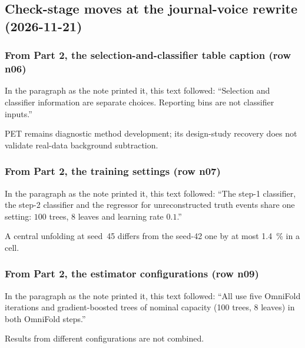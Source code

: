 \subsection{Check-stage moves at the journal-voice rewrite (2026-11-21)}

\subsubsection{From Part 2, the selection-and-classifier table caption (row n06)}
In the paragraph as the note printed it, this text followed: ``Selection and classifier information are separate choices. Reporting bins are not classifier inputs.''\par
PET remains diagnostic method development; its design-study recovery does not validate real-data background subtraction.

\subsubsection{From Part 2, the training settings (row n07)}
In the paragraph as the note printed it, this text followed: ``The step-1 classifier, the step-2 classifier and the regressor for unreconstructed truth events share one setting: $100$ trees, $8$ leaves and learning rate $0.1$.''\par
A central unfolding at seed~45 differs from the seed-42 one by at most \SI{1.4}{\percent} in a cell.

\subsubsection{From Part 2, the estimator configurations (row n09)}
In the paragraph as the note printed it, this text followed: ``All use five OmniFold iterations and gradient-boosted trees of nominal capacity (100 trees, 8 leaves) in both OmniFold steps.''\par
Results from different configurations are not combined.

